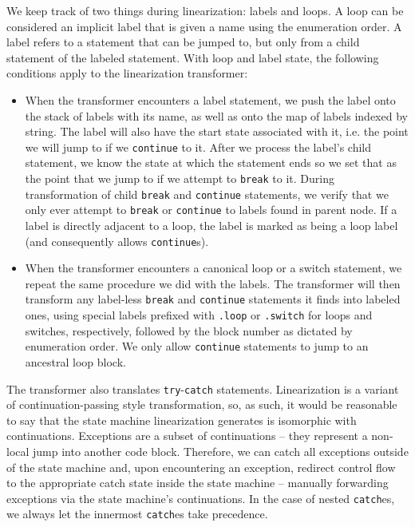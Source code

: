 \documentclass[journal,a4paper]{IEEEtran}
\begin{document}
We keep track of two things during linearization: labels and loops. A loop can be considered an
implicit label that is given a name using the enumeration order. A label refers to a statement that
can be jumped to, but only from a child statement of the labeled statement. With loop and label
state, the following conditions apply to the linearization transformer:

\begin{itemize}
\item When the transformer encounters a label statement, we push the label onto the stack of labels
with its name, as well as onto the map of labels indexed by string. The label will also have the
start state associated with it, i.e. the point we will jump to if we \texttt{continue} to it. After
we process the label's child statement, we know the state at which the statement ends so we set
that as the point that we jump to if we attempt to \texttt{break} to it. During transformation of
child \texttt{break} and \texttt{continue} statements, we verify that we only ever attempt to
\texttt{break} or \texttt{continue} to labels found in parent node. If a label is directly adjacent
to a loop, the label is marked as being a loop label (and consequently allows \texttt{continue}s).

\item When the transformer encounters a canonical loop or a switch statement, we repeat the same
procedure we did with the labels. The transformer will then transform any label-less \texttt{break}
and \texttt{continue} statements it finds into labeled ones, using special labels prefixed with
\texttt{.loop} or \texttt{.switch} for loops and switches, respectively, followed by the block
number as dictated by enumeration order. We only allow \texttt{continue} statements to jump to an
ancestral loop block.
\end{itemize}

The transformer also translates \texttt{try}-\texttt{catch} statements. Linearization is a variant
of continuation-passing style transformation, so, as such, it would be reasonable to say that the
state machine linearization generates is isomorphic with continuations. Exceptions are a subset of
continuations -- they represent a non-local jump into another code block. Therefore, we can catch
all exceptions outside of the state machine and, upon encountering an exception, redirect control
flow to the appropriate catch state inside the state machine -- manually forwarding exceptions via
the state machine's continuations. In the case of nested \texttt{catch}es, we always let the
innermost \texttt{catch}es take precedence.
\end{document}
